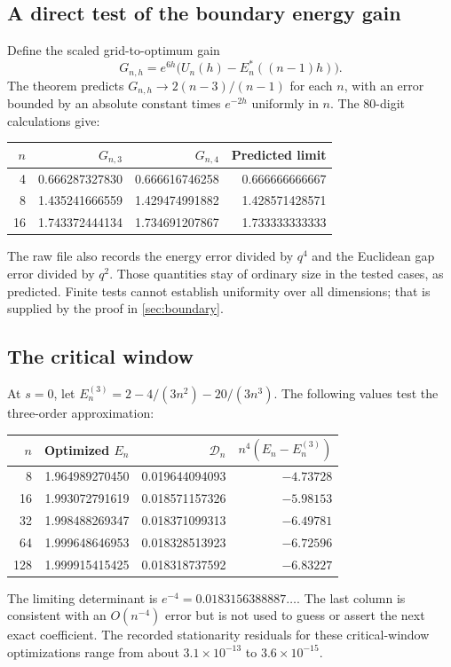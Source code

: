 \documentclass[11pt,a4paper]{article}
\theoremstyle{definition}
\theoremstyle{remark}
\newcommand{\Dopt}{\mathcal D}
\begin{document}
\subsection{A direct test of the boundary energy gain}
Define the scaled grid-to-optimum gain
\begin{equation}
 G_{n,h}=e^{6h}\bigl(U_n(h)-E_n^*((n-1)h)\bigr).
 \label{eq:Gcheck}
\end{equation}
The theorem predicts $G_{n,h}\to2(n-3)/(n-1)$ for each $n$, with an error
bounded by an absolute constant times $e^{-2h}$ uniformly in $n$.
The 80-digit calculations give:
\begin{center}
\begin{tabular}{@{}rrrr@{}}
\toprule
$n$ & $G_{n,3}$ & $G_{n,4}$ & Predicted limit\\
\midrule
4 & 0.666287327830 & 0.666616746258 & 0.666666666667\\
8 & 1.435241666559 & 1.429474991882 & 1.428571428571\\
16 & 1.743372444134 & 1.734691207867 & 1.733333333333\\
\bottomrule
\end{tabular}
\end{center}
The raw file also records the energy error divided by $q^4$ and the
Euclidean gap error divided by $q^2$. Those quantities stay of ordinary
size in the tested cases, as predicted. Finite tests cannot establish
uniformity over all dimensions; that is supplied by the proof in
\cref{sec:boundary}.

\subsection{The critical window}
At $s=0$, let
$E_n^{(3)}=2-4/(3n^2)-20/(3n^3)$.
The following values test the three-order approximation:
\begin{center}
\begin{tabular}{@{}rrrr@{}}
\toprule
$n$ & Optimized $E_n$ & $\Dopt_n$ & $n^4(E_n-E_n^{(3)})$\\
\midrule
8 & 1.964989270450 & 0.019644094093 & $-4.73728$\\
16 & 1.993072791619 & 0.018571157326 & $-5.98153$\\
32 & 1.998488269347 & 0.018371099313 & $-6.49781$\\
64 & 1.999648646953 & 0.018328513923 & $-6.72596$\\
128 & 1.999915415425 & 0.018318737592 & $-6.83227$\\
\bottomrule
\end{tabular}
\end{center}
The limiting determinant is $e^{-4}=0.0183156388887\ldots$.
The last column is consistent with an $O(n^{-4})$ error but is not used
to guess or assert the next exact coefficient. The recorded stationarity
residuals for these critical-window optimizations range from about
$3.1\times10^{-13}$ to $3.6\times10^{-15}$.
\end{document}
